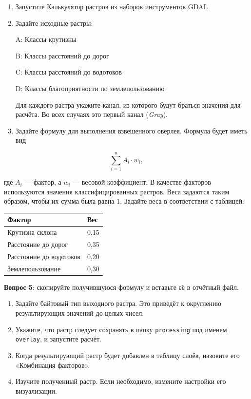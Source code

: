 \documentclass[
  12pt,
]{book}
\begin{document}
\begin{enumerate}
\def\labelenumi{\arabic{enumi}.}
\item
  Запустите Калькулятор растров из наборов инструментов GDAL
\item
  Задайте исходные растры:

  A: Классы крутизны

  B: Классы расстояний до дорог

  C: Классы расстояний до водотоков

  D: Классы благоприятности по землепользованию

  Для каждого растра укажите канал, из которого будут браться значения для расчёта. Во всех случаях это первый канал (\emph{Gray}).
\item
  Задайте формулу для выполнения взвешенного оверлея. Формула будет иметь вид
\end{enumerate}

\[\sum_{i=1}^n A_i \cdot w_i,\]

где \(A_i\) --- фактор, а \(w_i\) --- весовой коэффициент. В качестве факторов используются значения классифицированных растров. Веса задаются таким образом, чтобы их сумма была равна \(1\). Задайте веса в соответствии с таблицей:

\begin{longtable}[]{@{}ll@{}}
\toprule
Фактор & Вес\tabularnewline
\midrule
\endhead
Крутизна склона & 0,15\tabularnewline
Расстояние до дорог & 0,35\tabularnewline
Расстояние до водотоков & 0,20\tabularnewline
Землепользование & 0,30\tabularnewline
\bottomrule
\end{longtable}

\textbf{Вопрос 5}: скопируйте получившуюся формулу и вставьте её в отчётный файл.

\begin{enumerate}
\def\labelenumi{\arabic{enumi}.}
\setcounter{enumi}{3}
\item
  Задайте байтовый тип выходного растра. Это приведёт к округлению результирующих значений до целых чисел.
\item
  Укажите, что растр следует сохранять в папку \texttt{processing} под именем \texttt{overlay}, и запустите расчёт.
\item
  Когда результирующий растр будет добавлен в таблицу слоёв, назовите его «Комбинация факторов».
\item
  Изучите полученный растр. Если необходимо, измените настройки его визуализации.
\end{enumerate}
\end{document}
